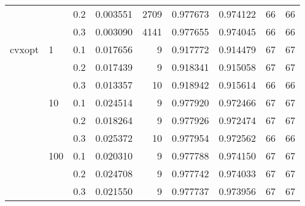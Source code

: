 \begin{table}[H]
\begin{tabular}{lllrrrrrr}
       &     & 0.2 &  0.003551 &    2709 &  0.977673 &  0.974122 &          66 &        66 \\
       &     & 0.3 &  0.003090 &    4141 &  0.977655 &  0.974045 &          66 &        66 \\
cvxopt & 1   & 0.1 &  0.017656 &       9 &  0.917772 &  0.914479 &          67 &        67 \\
       &     & 0.2 &  0.017439 &       9 &  0.918341 &  0.915058 &          67 &        67 \\
       &     & 0.3 &  0.013357 &      10 &  0.918942 &  0.915614 &          66 &        66 \\
       & 10  & 0.1 &  0.024514 &       9 &  0.977920 &  0.972466 &          67 &        67 \\
       &     & 0.2 &  0.018264 &       9 &  0.977926 &  0.972474 &          67 &        67 \\
       &     & 0.3 &  0.025372 &      10 &  0.977954 &  0.972562 &          66 &        66 \\
       & 100 & 0.1 &  0.020310 &       9 &  0.977788 &  0.974150 &          67 &        67 \\
       &     & 0.2 &  0.024708 &       9 &  0.977742 &  0.974033 &          67 &        67 \\
       &     & 0.3 &  0.021550 &       9 &  0.977737 &  0.973956 &          67 &        67 \\
\bottomrule
\end{tabular}
\end{table}

